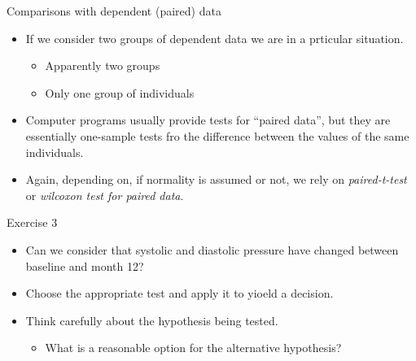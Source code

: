 \documentclass[
  ignorenonframetext,
]{beamer}
\providecommand{\tightlist}{%
  \setlength{\itemsep}{0pt}\setlength{\parskip}{0pt}}
\begin{document}
\begin{frame}{Comparisons with dependent (paired) data}
\protect\hypertarget{comparisons-with-dependent-paired-data}{}
\begin{itemize}
\item
  If we consider two groups of dependent data we are in a prticular
  situation.

  \begin{itemize}
  \tightlist
  \item
    Apparently two groups
  \item
    Only one group of individuals
  \end{itemize}
\item
  Computer programs usually provide tests for ``paired data'', but they
  are essentially one-sample tests fro the difference between the values
  of the same individuals.
\item
  Again, depending on, if normality is assumed or not, we rely on
  \emph{paired-t-test} or \emph{wilcoxon test for paired data}.
\end{itemize}
\end{frame}

\begin{frame}{Exercise 3}
\protect\hypertarget{exercise-3}{}
\begin{itemize}
\tightlist
\item
  Can we consider that systolic and diastolic pressure have changed
  between baseline and month 12?
\item
  Choose the appropriate test and apply it to yioeld a decision.
\item
  Think carefully about the hypothesis being tested.

  \begin{itemize}
  \tightlist
  \item
    What is a reasonable option for the alternative hypothesis?
  \end{itemize}
\end{itemize}
\end{frame}
\end{document}
